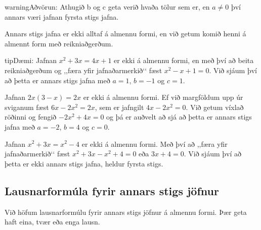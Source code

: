 \documentclass[a4paper,10pt,icelandic]{sphinxmanual}
\begin{document}
\begin{sphinxadmonition}{warning}{Aðvörun:}
Athugið b og c geta verið hvaða tölur sem er, en \(a \neq 0\) því annars væri jafnan fyrsta stigs jafna.
\end{sphinxadmonition}

Annars stigs jafna er ekki alltaf á almennu formi, en við getum komið henni á almennt form með reikniaðgerðum.

\begin{sphinxadmonition}{tip}{Dæmi:}
 Jafnan \(x^2+3x=4x+1\) er ekki á almennu formi, en með því að beita reikniaðgerðum og ,,færa yfir jafnaðarmerkið‘‘ fæst \(x^2-x+1=0\).
Við sjáum því að þetta er annars stigs jafna með \(a=1\), \(b=-1\) og \(c=1\).

 Jafnan \(2x(3-x)=2x\) er ekki á almennu formi. Ef við margföldum upp úr sviganum fæst \(6x-2x^2=2x\), sem er jafngilt \(4x-2x^2=0\).
Við getum víxlað röðinni og fengið \(-2x^2+4x=0\) og þá er auðvelt að sjá að þetta er annars stigs jafna með \(a=-2\), \(b=4\) og \(c=0\).

 Jafnan \(x^2+3x=x^2-4\) er ekki á almennu formi. Með því að ,,færa yfir jafnaðarmerkið‘‘ fæst \(x^2+3x-x^2+4=0\) eða \(3x+4=0\).
Við sjáum því að þetta er ekki annars stigs jafna, heldur fyrsta stigs.
\end{sphinxadmonition}


\subsection{Lausnarformúla fyrir annars stigs jöfnur}
\label{\detokenize{Kafli02:lausnarformula-fyrir-annars-stigs-jofnur}}
Við höfum lausnarformúlu fyrir annars stigs jöfnur á almennu formi. Þær geta haft eina, tvær eða enga lausn.
\end{document}
